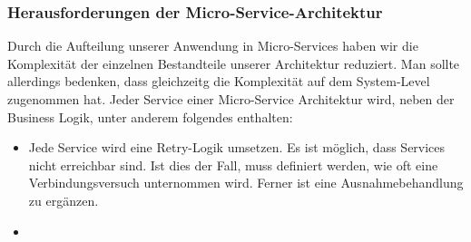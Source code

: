 \subsubsection{Herausforderungen der Micro-Service-Architektur}
Durch die Aufteilung unserer Anwendung in Micro-Services haben wir die Komplexität der einzelnen Bestandteile unserer Architektur reduziert. Man sollte allerdings bedenken, dass gleichzeitg die Komplexität auf dem System-Level zugenommen hat. Jeder Service einer Micro-Service Architektur wird, neben der Business Logik, unter anderem folgendes enthalten:
\begin{itemize}
    \item Jede Service wird eine Retry-Logik umsetzen. Es ist möglich, dass Services nicht erreichbar sind. Ist dies der Fall, muss definiert werden, wie oft eine Verbindungsversuch unternommen wird. Ferner ist eine Ausnahmebehandlung zu ergänzen.
    \item
    
\end{itemize}
